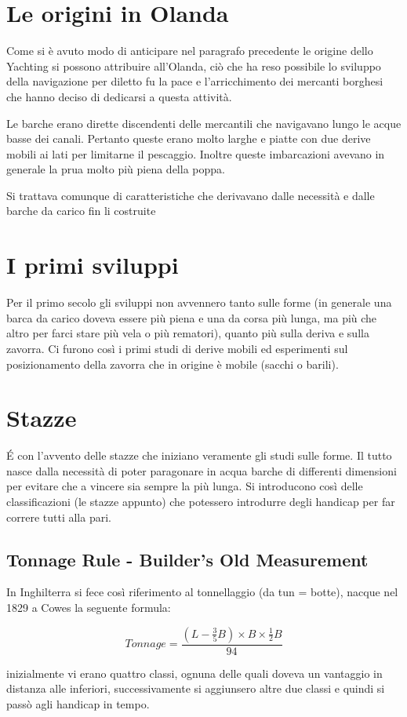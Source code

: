 	\section{Le origini in Olanda}
		Come si è avuto modo di anticipare nel paragrafo precedente le origine dello Yachting si possono attribuire all'Olanda, ciò che ha reso possibile lo sviluppo della navigazione per diletto fu la pace e l'arricchimento dei mercanti borghesi che hanno deciso di dedicarsi a questa attività.
	
		Le barche erano dirette discendenti delle mercantili che navigavano lungo le acque basse dei canali. Pertanto queste erano molto larghe e piatte con due derive mobili ai lati per limitarne il pescaggio. Inoltre queste imbarcazioni avevano in generale la prua molto più piena della poppa.
	
		Si trattava comunque di caratteristiche che derivavano dalle necessità e dalle barche da carico fin li costruite
	
	\section{I primi sviluppi}
		Per il primo secolo gli sviluppi non avvennero tanto sulle forme (in generale una barca da carico doveva essere più piena e una da corsa più lunga, ma più che altro per farci stare più vela o più rematori), quanto più sulla deriva e sulla zavorra. Ci furono così i primi studi di derive mobili ed esperimenti sul posizionamento della zavorra che in origine è mobile (sacchi o barili).
	
	\section{Stazze}
		\'E con l'avvento delle stazze che iniziano veramente gli studi sulle forme. Il tutto nasce dalla necessità di poter paragonare in acqua barche di differenti dimensioni per evitare che a vincere sia sempre la più lunga. Si introducono così delle classificazioni (le stazze appunto) che potessero introdurre degli handicap per far correre tutti alla pari.
	
		\subsection{Tonnage Rule - Builder's Old Measurement}
			In Inghilterra si fece così riferimento al tonnellaggio (da tun = botte), nacque nel 1829 a Cowes la seguente formula:
		
			\begin{center}
				\begin{equation}
					Tonnage=\frac{(L-\frac{3}{5}B) \times B \times \frac{1}{2}B}{94}
					\label{eq:Tonnage}
				\end{equation}
			\end{center}
			inizialmente vi erano quattro classi, ognuna delle quali doveva un vantaggio in distanza alle inferiori, successivamente si aggiunsero altre due classi e quindi si passò agli handicap in tempo.
		
